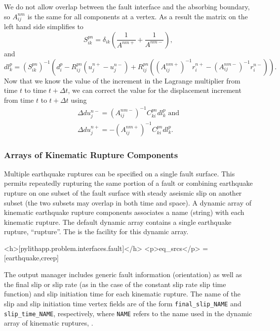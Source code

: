 We do not allow overlap between the fault interface and the absorbing
boundary, so $A_{ij}^{nm}$ is the same for all components at a vertex.
As a result the matrix on the left hand side simplifies to
\begin{equation}
S_{ik}^{pn}=\delta_{ik}\left(\frac{1}{A^{nm+}}+\frac{1}{A^{nm-}}\right),
\end{equation}
and
\begin{equation}
dl_{k}^{p}=(S_{ik}^{pn})^{-1}\left(d_{i}^{p}-R_{ij}^{pn}(u_{j}^{n+}-u_{j}^{n-})+R_{ij}^{pn}\left((A_{ij}^{nm+})^{-1}r_{i}^{n+}-(A_{ij}^{nm-})^{-1}r_{i}^{n-}\right)\right).
\end{equation}
Now that we know the value of the increment in the Lagrange multiplier
from time $t$ to time $t+\Delta t$, we can correct the value for
the displacement increment from time $t$ to $t+\Delta t$ using
\begin{gather}
\Delta du_{j}^{n-}=(A_{ij}^{nm-})^{-1}C_{ki}^{pn}dl_{k}^{p}\text{ and}\\
\Delta du_{j}^{n+}=-(A_{ij}^{nm+})^{-1}C_{ki}^{pn}dl_{k}^{p}.
\end{gather}

\subsubsection{Arrays of Kinematic Rupture Components}

Multiple earthquake ruptures can be specified on a single fault surface.
This permits repeatedly rupturing the same portion of a fault or combining
earthquake rupture on one subset of the fault surface with steady
aseismic slip on another subset (the two subsets may overlap in both
time and space). A dynamic array of kinematic earthquake rupture components
associates a name (string) with each kinematic rupture. The default
dynamic array contains a single earthquake rupture, ``rupture''. The
 is the  facility for this
dynamic array.

\begin{cfg}
<h>[pylithapp.problem.interfaces.fault]</h>
<p>eq_srcs</p> = [earthquake,creep]
\end{cfg}
The output manager includes generic fault information (orientation)
as well as the final slip or slip rate (as in the case of the constant
slip rate slip time function) and slip initiation time for each kinematic
rupture. The name of the slip and slip initiation time vertex fields
are of the form \texttt{final\_slip\_NAME} and \texttt{slip\_time\_NAME},
respectively, where \texttt{NAME} refers to the name used in the dynamic
array of kinematic ruptures, .

